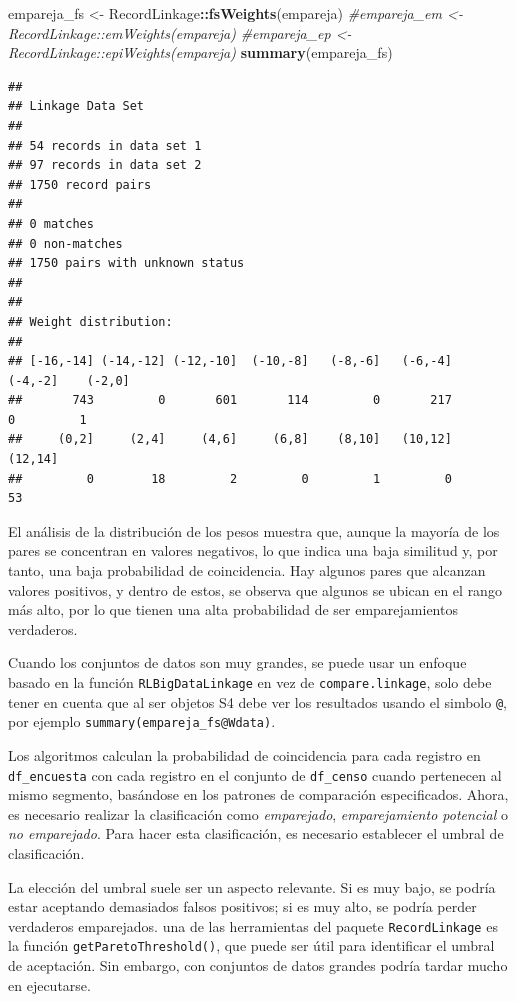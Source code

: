 \documentclass[
  12pt,
]{book}
\newenvironment{Shaded}{\begin{snugshade}}{\end{snugshade}}
\newcommand{\CommentTok}[1]{\textcolor[rgb]{0.56,0.35,0.01}{\textit{#1}}}
\newcommand{\FunctionTok}[1]{\textcolor[rgb]{0.13,0.29,0.53}{\textbf{#1}}}
\newcommand{\NormalTok}[1]{#1}
\newcommand{\OtherTok}[1]{\textcolor[rgb]{0.56,0.35,0.01}{#1}}
\newcommand{\SpecialCharTok}[1]{\textcolor[rgb]{0.81,0.36,0.00}{\textbf{#1}}}
\begin{document}
\begin{Shaded}
\begin{Highlighting}[]
\NormalTok{empareja\_fs }\OtherTok{\textless{}{-}}\NormalTok{ RecordLinkage}\SpecialCharTok{::}\FunctionTok{fsWeights}\NormalTok{(empareja)}
\CommentTok{\#empareja\_em \textless{}{-} RecordLinkage::emWeights(empareja)}
\CommentTok{\#empareja\_ep \textless{}{-} RecordLinkage::epiWeights(empareja)}
\FunctionTok{summary}\NormalTok{(empareja\_fs)}
\end{Highlighting}
\end{Shaded}

\begin{verbatim}
## 
## Linkage Data Set
## 
## 54 records in data set 1 
## 97 records in data set 2 
## 1750 record pairs 
## 
## 0 matches
## 0 non-matches
## 1750 pairs with unknown status
## 
## 
## Weight distribution:
## 
## [-16,-14] (-14,-12] (-12,-10]  (-10,-8]   (-8,-6]   (-6,-4]   (-4,-2]    (-2,0] 
##       743         0       601       114         0       217         0         1 
##     (0,2]     (2,4]     (4,6]     (6,8]    (8,10]   (10,12]   (12,14] 
##         0        18         2         0         1         0        53
\end{verbatim}

El análisis de la distribución de los pesos muestra que, aunque la mayoría de los pares se concentran en valores negativos, lo que indica una baja similitud y, por tanto, una baja probabilidad de coincidencia. Hay algunos pares que alcanzan valores positivos, y dentro de estos, se observa que algunos se ubican en el rango más alto, por lo que tienen una alta probabilidad de ser emparejamientos verdaderos.

Cuando los conjuntos de datos son muy grandes, se puede usar un enfoque basado en la función \texttt{RLBigDataLinkage} en vez de \texttt{compare.linkage}, solo debe tener en cuenta que al ser objetos S4 debe ver los resultados usando el simbolo \texttt{@}, por ejemplo \texttt{summary(empareja\_fs@Wdata)}.

Los algoritmos calculan la probabilidad de coincidencia para cada registro en \texttt{df\_encuesta} con cada registro en el conjunto de \texttt{df\_censo} cuando pertenecen al mismo segmento, basándose en los patrones de comparación especificados. Ahora, es necesario realizar la clasificación como \emph{emparejado}, \emph{emparejamiento potencial} o \emph{no emparejado}. Para hacer esta clasificación, es necesario establecer el umbral de clasificación.

La elección del umbral suele ser un aspecto relevante. Si es muy bajo, se podría estar aceptando demasiados falsos positivos; si es muy alto, se podría perder verdaderos emparejados. una de las herramientas del paquete \texttt{RecordLinkage} es la función \texttt{getParetoThreshold()}, que puede ser útil para identificar el umbral de aceptación. Sin embargo, con conjuntos de datos grandes podría tardar mucho en ejecutarse.
\end{document}
